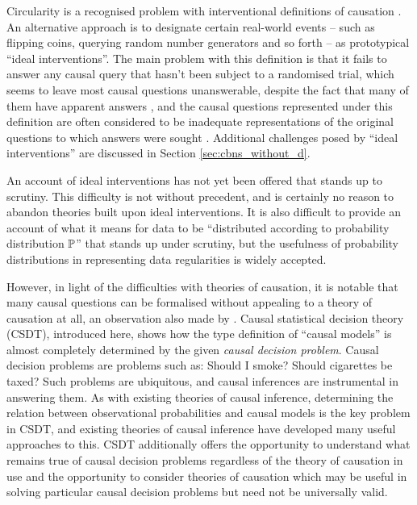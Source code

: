Circularity is a recognised problem with interventional definitions of causation \citep{woodward_causation_2016}. An alternative approach is to designate certain real-world events -- such as flipping coins, querying random number generators and so forth -- as prototypical ``ideal interventions''. The main problem with this definition is that it fails to answer any causal query that hasn't been subject to a randomised trial, which seems to leave most causal questions unanswerable, despite the fact that many of them have apparent answers \citep{pearl_challenging_2018}, and the causal questions represented under this definition are often considered to be inadequate representations of the original questions to which answers were sought \citep{deaton_understanding_2018,heckman_randomization_1991}. Additional challenges posed by ``ideal interventions'' are discussed in Section \ref{sec:cbns_without_d}.

An account of ideal interventions has not yet been offered that stands up to scrutiny. This difficulty is not without precedent, and is certainly no reason to abandon theories built upon ideal interventions. It is also difficult to provide an account of what it means for data to be ``distributed according to probability distribution $\mathbb{P}$''\citep{hajek_interpretations_2019} that stands up under scrutiny, but the usefulness of probability distributions in representing data regularities is widely accepted.

However, in light of the difficulties with theories of causation, it is notable that many causal questions can be formalised without appealing to a theory of causation at all, an observation also made by \citet{dawid_decision-theoretic_2020}. Causal statistical decision theory (CSDT), introduced here, shows how the type definition of ``causal models'' is almost completely determined by the given \emph{causal decision problem}. Causal decision problems are problems such as: Should I smoke? Should cigarettes be taxed? Such problems are ubiquitous, and causal inferences are instrumental in answering them. As with existing theories of causal inference, determining the relation between observational probabilities and causal models is the key problem in CSDT, and existing theories of causal inference have developed many useful approaches to this. CSDT additionally offers the opportunity to understand what remains true of causal decision problems regardless of the theory of causation in use and the opportunity to consider theories of causation which may be useful in solving particular causal decision problems but need not be universally valid.

